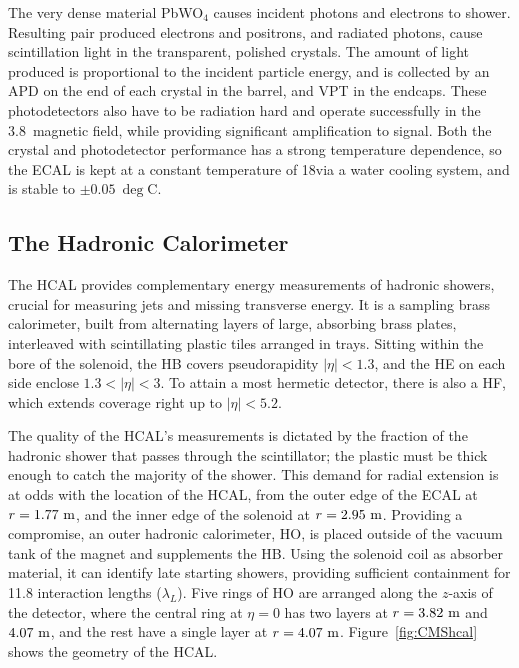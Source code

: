 The very dense material PbWO$_{4}$ causes incident photons and electrons to shower. 
Resulting pair produced electrons and positrons, and radiated photons, cause scintillation light in the transparent, polished crystals. 
The amount of light produced is proportional to the incident particle energy, and is collected by an \ac{APD} on the end of each crystal in the barrel, and \ac{VPT} in the endcaps.
These photodetectors also have to be radiation hard and operate successfully in the 3.8~\T magnetic field, while providing significant amplification to signal.
Both the crystal and photodetector performance has a strong temperature dependence, so the \ac{ECAL} is kept at a constant temperature of 18\deg via a water cooling system, and is stable to $\pm0.05~\deg$C.




\subsection{The Hadronic Calorimeter}
The \ac{HCAL} provides complementary energy measurements of hadronic showers, crucial for measuring jets and missing transverse energy.
It is a sampling brass calorimeter, built from alternating layers of large, absorbing brass plates, interleaved with scintillating plastic tiles arranged in trays. 
Sitting within the bore of the solenoid, the \ac{HB} covers pseudorapidity $|\eta|<1.3$,
and the \ac{HE} on each side enclose $1.3<|\eta|<3$.
To attain a most hermetic detector, there is also a \ac{HF}, which extends coverage right up to $|\eta|<5.2$.

The quality of the \ac{HCAL}'s measurements is dictated by the fraction of the hadronic shower that passes through the scintillator; the plastic must be thick enough to catch the majority of the shower.
This demand for radial extension is at odds with the location of the \ac{HCAL}, from the outer edge of the \ac{ECAL} at $r=1.77~\mathrm{m}$, and the inner edge of the solenoid at $r=2.95~\mathrm{m}$.
Providing a compromise, an outer hadronic calorimeter, \ac{HO}, is placed outside of the vacuum tank of the magnet and supplements the \ac{HB}.
Using the solenoid coil as absorber material, it can identify late starting showers, providing sufficient containment for 11.8 interaction lengths ($\lambda_{L}$).
Five rings of \ac{HO} are arranged along the $z$-axis of the detector, where the central ring at $\eta=0$ has two layers at $r=3.82~\mathrm{m}$ and $4.07~\mathrm{m}$, and the rest have a single layer at $r=4.07~\mathrm{m}$. 
Figure~\ref{fig:CMShcal} shows the geometry of the \ac{HCAL}.

